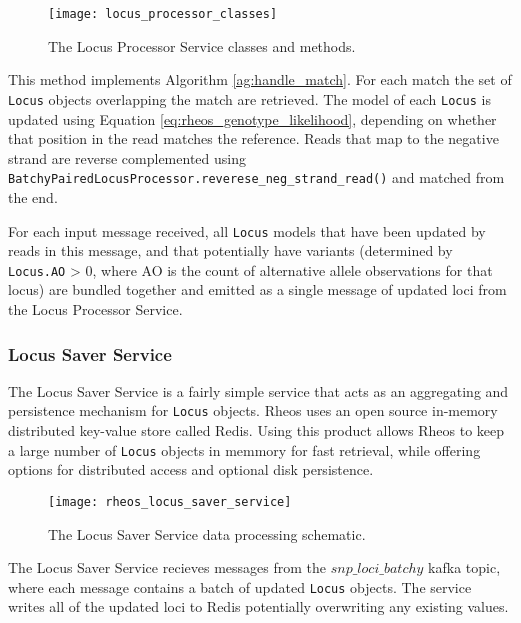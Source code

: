 \begin{figure}[h!]
    \texttt{[image: locus\_processor\_classes]}
    \centering
    \caption {The Locus Processor Service classes and methods.}
    \label{fig:locus_processor_classes}
\end{figure}

This method implements Algorithm \ref{ag:handle_match}. For each match the set of \texttt{Locus} objects overlapping the match are retrieved. The model of each \texttt{Locus} is updated using Equation \ref{eq:rheos_genotype_likelihood}, depending on whether that position in the read matches the reference. Reads that map to the negative strand are reverse complemented using \texttt{BatchyPairedLocusProcessor.reverese_neg_strand_read()} and matched from the end.

For each input message received, all \texttt{Locus} models that have been updated by reads in this message, and that potentially have variants (determined by \texttt{Locus.AO} > 0, where AO is the count of alternative allele observations for that locus) are bundled together and emitted as a single message of updated loci from the Locus Processor Service.

\subsubsection{Locus Saver Service}

The Locus Saver Service is a fairly simple service that acts as an aggregating and persistence mechanism for \texttt{Locus} objects. Rheos uses an open source in-memory distributed key-value store called Redis\autocite{carlson2013redis}. Using this product allows Rheos to keep a large number of \texttt{Locus} objects in memmory for fast retrieval, while offering options for distributed access and optional disk persistence.

\begin{figure}[h!]
    \texttt{[image: rheos\_locus\_saver\_service]}
    \centering
    \caption {The Locus Saver Service data processing schematic.}
    \label{fig:rheos_locus_saver_service}
\end{figure}

The Locus Saver Service recieves messages from the $snp\_loci\_batchy$ kafka topic, where each message contains a batch of updated \texttt{Locus} objects. The service writes all of the updated loci to Redis potentially overwriting any existing values.

